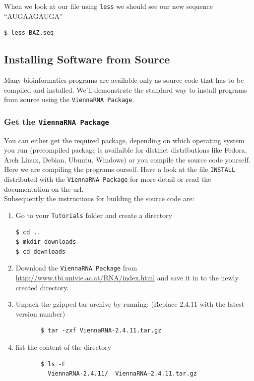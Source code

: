 \documentclass[a4paper]{article}
\newcommand{\frametitle}[1]{\subsubsection{#1}}
\begin{document}
When we look at our file using \texttt{less} we should see our new sequence ``AUGAAGAUGA''
\begin{verbatim}
$ less BAZ.seq
\end{verbatim}

\subsection{Installing Software from Source}
\label{sect:install}

Many bioinformatics programs are available only as source code that has to
be compiled and installed. We'll demonstrate the standard way to install
programs from source using the \texttt{ViennaRNA Package}.

 \frametitle{Get the \texttt{ViennaRNA Package}}
You can either get the required package, depending on which operating system you run 
(precompiled package is availaible for distinct distributions like Fedora, Arch Linux, Debian, Ubuntu, 
Windows) or you compile the source code yourself. Here we are compiling the programs ourself.
Have a look at the file \texttt{INSTALL} distributed with the \texttt{ViennaRNA Package} 
for more detail or read the documentation on the url. \\

Subsequently the instructions for building the source code are:

  \begin{enumerate}
  \item Go to your \texttt{Tutorials} folder and create a directory 
\begin{verbatim}
$ cd ..
$ mkdir downloads
$ cd downloads
\end{verbatim}
  \item Download the \texttt{ViennaRNA Package} from
    \url{http://www.tbi.univie.ac.at/RNA/index.html} and save it in to the newly created
    directory.
  \item Unpack the gzipped tar archive by running: (Replace 2.4.11 with the latest version number)
    \begin{verbatim}
       $ tar -zxf ViennaRNA-2.4.11.tar.gz
    \end{verbatim}
  \item list the content of the directory
    \begin{verbatim}
       $ ls -F
         ViennaRNA-2.4.11/  ViennaRNA-2.4.11.tar.gz
    \end{verbatim}
  \end{enumerate}
\end{document}

